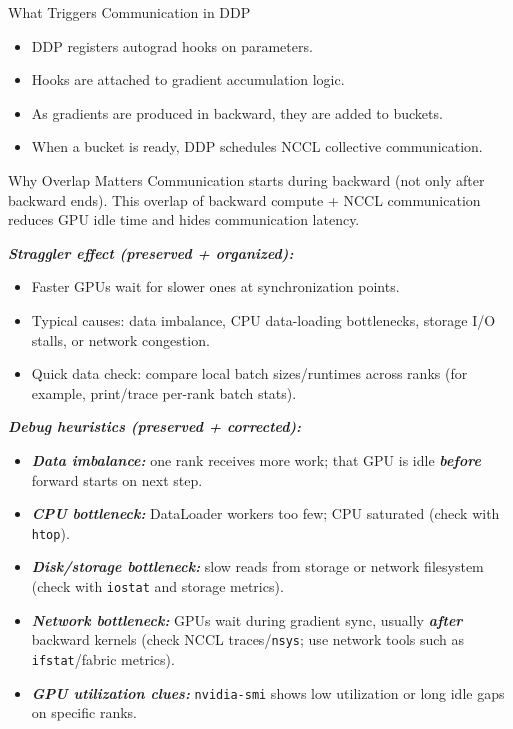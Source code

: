 \documentclass[12pt]{article}
\let\origtextbf\textbf
\renewcommand{\textbf}[1]{\origtextbf{\textit{#1}}}
\begin{document}
\begin{bluebox}{What Triggers Communication in DDP}
\begin{itemize}
\item DDP registers autograd hooks on parameters.
\item Hooks are attached to gradient accumulation logic.
\item As gradients are produced in backward, they are added to buckets.
\item When a bucket is ready, DDP schedules NCCL collective communication.
\end{itemize}
\end{bluebox}

\begin{redbox}{Why Overlap Matters}
Communication starts during backward (not only after backward ends).  
This overlap of backward compute + NCCL communication reduces GPU idle time and hides communication latency.
\end{redbox}

\textbf{Straggler effect (preserved + organized):}
\begin{itemize}
\item Faster GPUs wait for slower ones at synchronization points.
\item Typical causes: data imbalance, CPU data-loading bottlenecks, storage I/O stalls, or network congestion.
\item Quick data check: compare local batch sizes/runtimes across ranks (for example, print/trace per-rank batch stats).
\end{itemize}

\textbf{Debug heuristics (preserved + corrected):}
\begin{itemize}
\item \textbf{Data imbalance:} one rank receives more work; that GPU is idle \textbf{before} forward starts on next step.
\item \textbf{CPU bottleneck:} DataLoader workers too few; CPU saturated (check with \texttt{htop}).
\item \textbf{Disk/storage bottleneck:} slow reads from storage or network filesystem (check with \texttt{iostat} and storage metrics).
\item \textbf{Network bottleneck:} GPUs wait during gradient sync, usually \textbf{after} backward kernels (check NCCL traces/\texttt{nsys}; use network tools such as \texttt{ifstat}/fabric metrics).
\item \textbf{GPU utilization clues:} \texttt{nvidia-smi} shows low utilization or long idle gaps on specific ranks.
\end{itemize}
\end{document}
